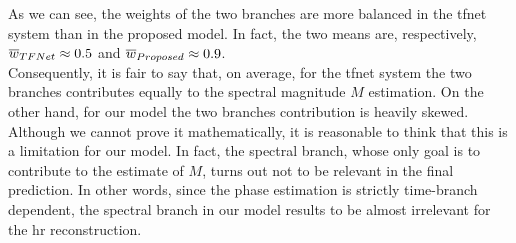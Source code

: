 \noindent As we can see, the weights of the two branches are more balanced in the \gls{tfnet} system than in the proposed model. In fact, the two means are, respectively, $\mathop{\overline{w}}_{TFNet} \approx 0.5$ and  $\mathop{\overline{w}}_{Proposed} \approx 0.9$. \\
Consequently, it is fair to say that, on average, for the \gls{tfnet} system the two branches contributes equally to the spectral magnitude $M$ estimation. On the other hand, for our model the two branches contribution is heavily skewed. \\
Although we cannot prove it mathematically, it is reasonable to think that this is a limitation for our model. In fact, the spectral branch, whose only goal is to contribute to the estimate of $M$, turns out not to be relevant in the final prediction. In other words, since the phase estimation is strictly time-branch dependent, the spectral branch in our model results to be almost irrelevant for the \gls{hr} reconstruction. \\
